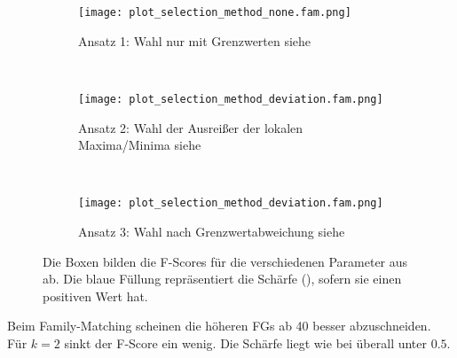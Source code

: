         \begin{figure}[H]
            \centering
            \begin{subfigure}{\textwidth}
                \texttt{[image: plot\_selection\_method\_none.fam.png]}
                \caption{Ansatz 1: Wahl nur mit Grenzwerten siehe }
                \label{fig:selection_method.none.fam}
            \end{subfigure}\\
            \begin{subfigure}{\textwidth}
                \texttt{[image: plot\_selection\_method\_deviation.fam.png]}
                \caption{Ansatz 2: Wahl der Ausreißer der lokalen Maxima/Minima siehe }
                \label{fig:selection_method.absolute.fam}
            \end{subfigure}\\
            \begin{subfigure}{\textwidth}
                \texttt{[image: plot\_selection\_method\_deviation.fam.png]}
                \caption{Ansatz 3: Wahl nach Grenzwertabweichung siehe }
                \label{fig:selection_method.deviation.fam}
            \end{subfigure}
            \caption[Family-Matching ]{Die Boxen bilden die F-Scores für die verschiedenen Parameter aus  ab. Die blaue Füllung repräsentiert die Schärfe (), sofern sie einen positiven Wert hat.}
            \label{fig:selection_method.fam}
        \end{figure}

        Beim Family-Matching scheinen die höheren \acp{FG} ab 40 besser abzuschneiden. Für $k=2$ sinkt der F-Score ein wenig. Die Schärfe liegt wie bei  überall unter $0.5$.
